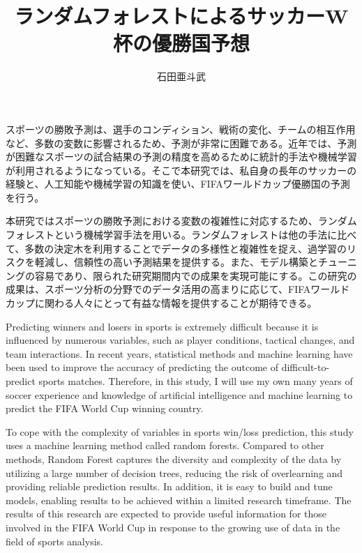 \documentclass[platex]{suribt}
\title{ランダムフォレストによるサッカーW杯の優勝国予想}
\author{石田亜斗武}
\begin{document}
\maketitle%


\frontmatter%
\begin{jabstract}%
  スポーツの勝敗予測は、選手のコンディション、戦術の変化、チームの相互作用など、多数の変数に影響されるため、予測が非常に困難である。近年では、予測が困難なスポーツの試合結果の予測の精度を高めるために統計的手法や機械学習が利用されるようになっている。そこで本研究では、私自身の長年のサッカーの経験と、人工知能や機械学習の知識を使い、FIFAワールドカップ優勝国の予測を行う。\par
  本研究ではスポーツの勝敗予測における変数の複雑性に対応するため、ランダムフォレストという機械学習手法を用いる。ランダムフォレストは他の手法に比べて、多数の決定木を利用することでデータの多様性と複雑性を捉え、過学習のリスクを軽減し、信頼性の高い予測結果を提供する。また、モデル構築とチューニングの容易であり、限られた研究期間内での成果を実現可能にする。この研究の成果は、スポーツ分析の分野でのデータ活用の高まりに応じて、FIFAワールドカップに関わる人々にとって有益な情報を提供することが期待できる。
\end{jabstract}

\newpage


\begin{eabstract}%
  Predicting winners and losers in sports is extremely difficult because it is influenced by numerous variables, such as player conditions, tactical changes, and team interactions. In recent years, statistical methods and machine learning have been used to improve the accuracy of predicting the outcome of difficult-to-predict sports matches. Therefore, in this study, I will use my own many years of soccer experience and knowledge of artificial intelligence and machine learning to predict the FIFA World Cup winning country.\par
  To cope with the complexity of variables in sports win/loss prediction, this study uses a machine learning method called random forests. Compared to other methods, Random Forest captures the diversity and complexity of the data by utilizing a large number of decision trees, reducing the risk of overlearning and providing reliable prediction results. In addition, it is easy to build and tune models, enabling results to be achieved within a limited research timeframe. The results of this research are expected to provide useful information for those involved in the FIFA World Cup in response to the growing use of data in the field of sports analysis. 
\end{eabstract}
\end{document}

